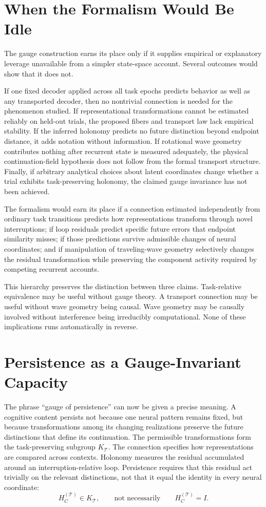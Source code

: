 \documentclass[11pt]{book}
\begin{document}
\section*{When the Formalism Would Be Idle}

The gauge construction earns its place only if it supplies empirical or explanatory leverage unavailable from a simpler state-space account. Several outcomes would show that it does not.

If one fixed decoder applied across all task epochs predicts behavior as well as any transported decoder, then no nontrivial connection is needed for the phenomenon studied. If representational transformations cannot be estimated reliably on held-out trials, the proposed fibers and transport law lack empirical stability. If the inferred holonomy predicts no future distinction beyond endpoint distance, it adds notation without information. If rotational wave geometry contributes nothing after recurrent state is measured adequately, the physical continuation-field hypothesis does not follow from the formal transport structure. Finally, if arbitrary analytical choices about latent coordinates change whether a trial exhibits task-preserving holonomy, the claimed gauge invariance has not been achieved.

The formalism would earn its place if a connection estimated independently from ordinary task transitions predicts how representations transform through novel interruptions; if loop residuals predict specific future errors that endpoint similarity misses; if those predictions survive admissible changes of neural coordinates; and if manipulation of traveling-wave geometry selectively changes the residual transformation while preserving the component activity required by competing recurrent accounts.

This hierarchy preserves the distinction between three claims. Task-relative equivalence may be useful without gauge theory. A transport connection may be useful without wave geometry being causal. Wave geometry may be causally involved without interference being irreducibly computational. None of these implications runs automatically in reverse.

\section*{Persistence as a Gauge-Invariant Capacity}

The phrase ``gauge of persistence'' can now be given a precise meaning. A cognitive content persists not because one neural pattern remains fixed, but because transformations among its changing realizations preserve the future distinctions that define its continuation. The permissible transformations form the task-preserving subgroup $K_{\mathcal T}$. The connection specifies how representations are compared across contexts. Holonomy measures the residual accumulated around an interruption-relative loop. Persistence requires that this residual act trivially on the relevant distinctions, not that it equal the identity in every neural coordinate:
\[
H_C^{(\mathcal T)}\in K_{\mathcal T},
\qquad
\text{not necessarily}
\qquad
H_C^{(\mathcal T)}=I.
\]
\end{document}
